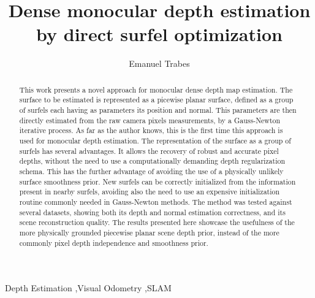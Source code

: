 \documentclass[1p]{elsarticle}
\begin{document}
\begin{frontmatter}

\title{Dense monocular depth estimation by direct surfel optimization}

\author{Emanuel Trabes}%
\address{Departamento de Electronica, Universidad Nacional de San Luis, Argentina}



\address{etrabes@unsl.edu.ar}

\begin{abstract}
This work presents a novel approach for monocular dense depth map estimation. The surface to be estimated is represented as a picewise planar surface, defined as a group of surfels each having as parameters its position and normal. This parameters are then directly estimated from the raw camera pixels measurements, by a Gauss-Newton iterative process. As far as the author knows, this is the first time this approach is used for monocular depth estimation. The representation of the surface as a group of surfels has several advantages. It allows the recovery of robust and accurate pixel depths, without the need to use a computationally demanding depth regularization schema. This has the further advantage of avoiding the use of a physically unlikely surface smoothness prior. New surfels can be correctly initialized from the information present in nearby surfels, avoiding also the need to use an expensive initialization routine commonly needed in Gauss-Newton methods. The method was tested against several datasets, showing both its depth and normal estimation correctness, and its scene reconstruction quality. The results presented here showcase the usefulness of the more physically grounded piecewise planar scene depth prior, instead of the more commonly pixel depth independence and smoothness prior.
\end{abstract}

\begin{keyword}
Depth Estimation \sep Visual Odometry \sep SLAM 
\end{keyword}

\end{frontmatter}
\end{document}
